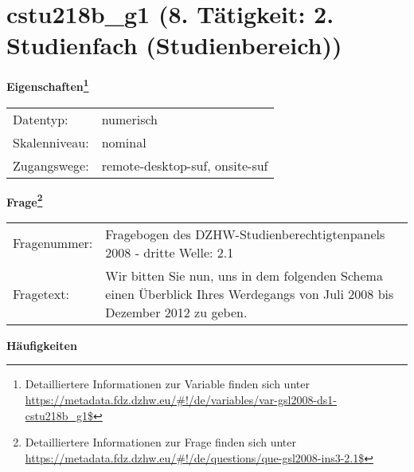 
    \setcounter{footnote}{0}

    \vspace*{-1.8cm}
	\section{cstu218b\_g1 (8. Tätigkeit: 2. Studienfach (Studienbereich))}
	\label{section:cstu218b_g1}



    \vspace*{0.5cm}
    \noindent\textbf{Eigenschaften\footnote{Detailliertere Informationen zur Variable finden sich unter
		\url{https://metadata.fdz.dzhw.eu/\#!/de/variables/var-gsl2008-ds1-cstu218b_g1$}}}\\
	\begin{tabularx}{\hsize}{@{}lX}
	Datentyp: & numerisch \\
	Skalenniveau: & nominal \\
	Zugangswege: &
	  remote-desktop-suf, 
	  onsite-suf
 \\
    \end{tabularx}



				\vspace*{0.5cm}
                \noindent\textbf{Frage\footnote{Detailliertere Informationen zur Frage finden sich unter
		              \url{https://metadata.fdz.dzhw.eu/\#!/de/questions/que-gsl2008-ins3-2.1$}}}\\
				\begin{tabularx}{\hsize}{@{}lX}
					Fragenummer: &
					  Fragebogen des DZHW-Studienberechtigtenpanels 2008 - dritte Welle:
					  2.1
 \\
					Fragetext: & Wir bitten Sie nun, uns in dem folgenden Schema einen Überblick Ihres Werdegangs von Juli 2008 bis Dezember 2012 zu geben. \\
				\end{tabularx}





        		\vspace*{0.5cm}
                \noindent\textbf{Häufigkeiten}

